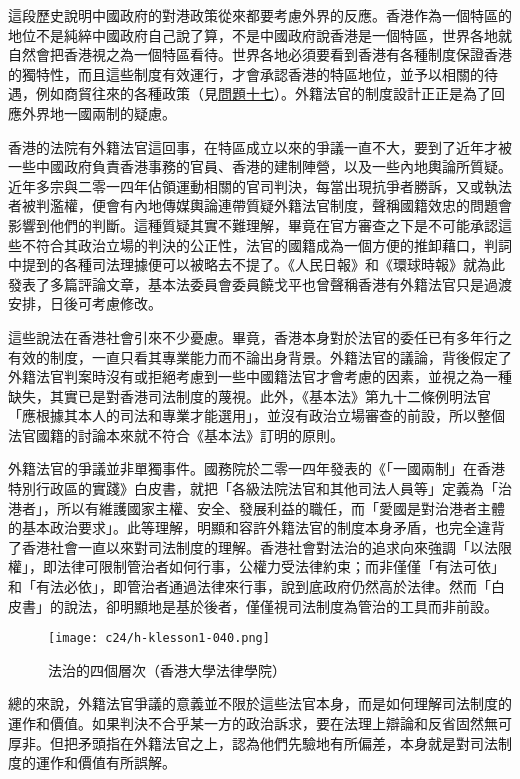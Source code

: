 這段歷史說明中國政府的對港政策從來都要考慮外界的反應。香港作為一個特區的地位不是純綷中國政府自己說了算，不是中國政府說香港是一個特區，世界各地就自然會把香港視之為一個特區看待。世界各地必須要看到香港有各種制度保證香港的獨特性，而且這些制度有效運行，才會承認香港的特區地位，並予以相關的待遇，例如商貿往來的各種政策（見\hyperref[sec:sec17]{問題十七}）。外籍法官的制度設計正正是為了回應外界地一國兩制的疑慮。

香港的法院有外籍法官這回事，在特區成立以來的爭議一直不大，要到了近年才被一些中國政府負責香港事務的官員、香港的建制陣營，以及一些內地輿論所質疑。近年多宗與二零一四年佔領運動相關的官司判決，每當出現抗爭者勝訴，又或執法者被判濫權，便會有內地傳媒輿論連帶質疑外籍法官制度，聲稱國籍效忠的問題會影響到他們的判斷。這種質疑其實不難理解，畢竟在官方審查之下是不可能承認這些不符合其政治立場的判決的公正性，法官的國籍成為一個方便的推卸藉口，判詞中提到的各種司法理據便可以被略去不提了。《人民日報》和《環球時報》就為此發表了多篇評論文章，基本法委員會委員饒戈平也曾聲稱香港有外籍法官只是過渡安排，日後可考慮修改。

這些說法在香港社會引來不少憂慮。畢竟，香港本身對於法官的委任已有多年行之有效的制度，一直只看其專業能力而不論出身背景。外籍法官的議論，背後假定了外籍法官判案時沒有或拒絕考慮到一些中國籍法官才會考慮的因素，並視之為一種缺失，其實已是對香港司法制度的蔑視。此外，《基本法》第九十二條例明法官「應根據其本人的司法和專業才能選用」，並沒有政治立場審查的前設，所以整個法官國籍的討論本來就不符合《基本法》訂明的原則。

外籍法官的爭議並非單獨事件。國務院於二零一四年發表的《「一國兩制」在香港特別行政區的實踐》白皮書，就把「各級法院法官和其他司法人員等」定義為「治港者」，所以有維護國家主權、安全、發展利益的職任，而「愛國是對治港者主體的基本政治要求」。此等理解，明顯和容許外籍法官的制度本身矛盾，也完全違背了香港社會一直以來對司法制度的理解。香港社會對法治的追求向來強調「以法限權」，即法律可限制管治者如何行事，公權力受法律約束；而非僅僅「有法可依」和「有法必依」，即管治者通過法律來行事，說到底政府仍然高於法律。然而「白皮書」的說法，卻明顯地是基於後者，僅僅視司法制度為管治的工具而非前設。

\begin{figure}[htbp]
    \centering
    \texttt{[image: c24/h-klesson1-040.png]}
    \caption{法治的四個層次（香港大學法律學院）} 
\end{figure}

總的來說，外籍法官爭議的意義並不限於這些法官本身，而是如何理解司法制度的運作和價值。如果判決不合乎某一方的政治訴求，要在法理上辯論和反省固然無可厚非。但把矛頭指在外籍法官之上，認為他們先驗地有所偏差，本身就是對司法制度的運作和價值有所誤解。


